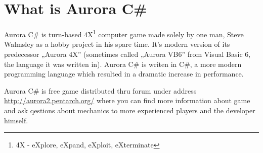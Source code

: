 \documentclass[../../Aurora C# unofficial manual.tex]{subfiles}
\begin{document}
	\section{What is Aurora C\#}
	Aurora C\# is turn-based 4X\footnote{4X - eXplore, eXpand, eXploit, eXterminate}
	computer game made solely by one man, Steve Walmsley as a hobby project in his spare time.
	It's modern version of its predecessor „Aurora 4X” (sometimes called „Aurora VB6” from
	Visual Basic 6, the language it was written in). Aurora C\# is writen in C\#, a more modern
	programming language which resulted in a dramatic increase in performance.
	
	Aurora C\# is free game distributed thru forum under address
	\href{http://aurora2.pentarch.org/}{http://aurora2.pentarch.org/} where you can find
	more information about game and ask qestions about mechanics to more experienced
	players and the developer himself.
\end{document}

